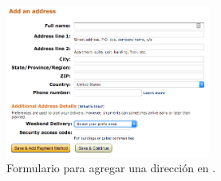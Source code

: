 
\begin{figure}[H]
	\centering
	\includegraphics[width=0.6\textwidth]{figuras/address/examples/amazon_address.png}
	\caption{Formulario para agregar una dirección en \amazonNAME.}
	\label{figure:apendice:address:example:amazon_address}
\end{figure}